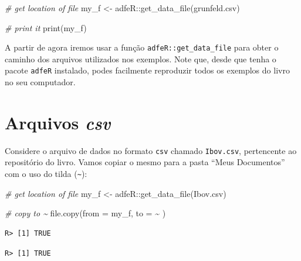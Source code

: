 \documentclass[
  11pt,
]{book}
\newenvironment{Shaded}{\begin{snugshade}}{\end{snugshade}}
\newcommand{\AttributeTok}[1]{\textcolor[rgb]{0.61,0.61,0.61}{#1}}
\newcommand{\CommentTok}[1]{\textcolor[rgb]{0.37,0.37,0.37}{\textit{#1}}}
\newcommand{\FunctionTok}[1]{\textcolor[rgb]{0,0,0}{#1}}
\newcommand{\NormalTok}[1]{#1}
\newcommand{\OtherTok}[1]{\textcolor[rgb]{0.37,0.37,0.37}{#1}}
\newcommand{\SpecialCharTok}[1]{\textcolor[rgb]{0,0,0}{#1}}
\newcommand{\StringTok}[1]{\textcolor[rgb]{0.5,0.5,0.5}{#1}}
\begin{document}
\begin{Shaded}
\begin{Highlighting}[]
\CommentTok{\# get location of file}
\NormalTok{my\_f }\OtherTok{\textless{}{-}}\NormalTok{ adfeR}\SpecialCharTok{::}\FunctionTok{get\_data\_file}\NormalTok{(}\StringTok{\textquotesingle{}grunfeld.csv\textquotesingle{}}\NormalTok{)}

\CommentTok{\# print it}
\FunctionTok{print}\NormalTok{(my\_f)}
\end{Highlighting}
\end{Shaded}

A partir de agora iremos usar a função \texttt{adfeR::get\_data\_file} para obter o caminho dos arquivos utilizados nos exemplos. Note que, desde que tenha o pacote \texttt{adfeR} instalado, podes facilmente reproduzir todos os exemplos do livro no seu computador.

\hypertarget{arquivos-csv}{%
\section{\texorpdfstring{Arquivos \emph{csv}}{Arquivos csv}}\label{arquivos-csv}}

Considere o arquivo de dados no formato \texttt{csv} chamado \texttt{\textquotesingle{}Ibov.csv\textquotesingle{}}, pertencente ao repositório do livro. Vamos copiar o mesmo para a pasta ``Meus Documentos'' com o uso do tilda (\texttt{\textasciitilde{}}):

\begin{Shaded}
\begin{Highlighting}[]
\CommentTok{\# get location of file}
\NormalTok{my\_f }\OtherTok{\textless{}{-}}\NormalTok{ adfeR}\SpecialCharTok{::}\FunctionTok{get\_data\_file}\NormalTok{(}\StringTok{\textquotesingle{}Ibov.csv\textquotesingle{}}\NormalTok{)}

\CommentTok{\# copy to \textasciitilde{}}
\FunctionTok{file.copy}\NormalTok{(}\AttributeTok{from =}\NormalTok{ my\_f, }
          \AttributeTok{to =} \StringTok{\textquotesingle{}\textasciitilde{}\textquotesingle{}}\NormalTok{ )}
\end{Highlighting}
\end{Shaded}

\begin{verbatim}
R> [1] TRUE
\end{verbatim}

\begin{verbatim}
R> [1] TRUE
\end{verbatim}
\end{document}
